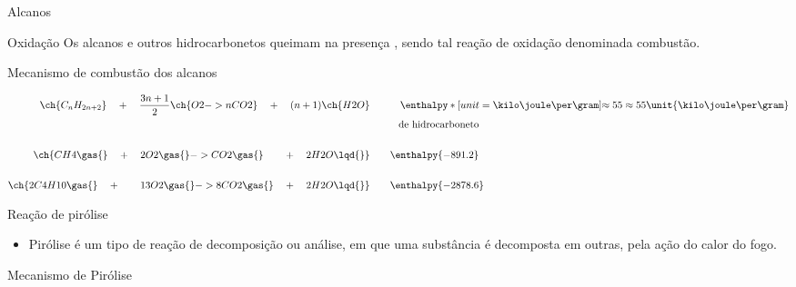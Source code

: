 \documentclass{beamer}
\begin{document}
\begin{frame}[label={sec:orga0e5a76}]{Alcanos}
\begin{block}{Oxidação}
Os \alert{alcanos} e outros \alert{hidrocarbonetos} queimam na presença , sendo tal reação de oxidação denominada
\alert{combustão}.


\begin{bclogo}[couleur=blue!30 , arrondi=0.1 , logo=\bcplume , epBarre=3.5]{Mecanismo de combustão dos alcanos}


\begin{align*}
\ch{C_nH_{2n+2}} \quad + \quad  \frac{3n+1}{2}\ch{O2 -> n CO2}\quad +\quad (n+1)\ch{H2O} & \qquad \quad \enthalpy*[unit=\kilo\joule\per\gram]{\approx 55} \approx 55 \unit{\kilo\joule\per\gram}\\ & \hspace{1cm} \mathrm{de~hidrocarboneto} \\ \\
\ch{CH4\gas{} \quad{} + \quad{} 2 O2\gas{} -> CO2\gas{} \qquad{} + \quad{} 2 H2O\lqd{}} & \quad \quad \enthalpy{-891.2}\\ \\
	\ch{2 C4H10\gas{} \quad{} + \qquad{} 13 O2\gas{} -> 8 CO2\gas{} \quad{} + \quad{} 2 H2O\lqd{}} & \quad \quad \enthalpy{-2878.6}    
\end{align*}
\end{bclogo}
\end{block}


\begin{block}{Reação de pirólise}
\begin{itemize}
\item \alert{Pirólise} é um tipo de reação de decomposição ou análise, em que uma substância é decomposta em outras, pela ação do calor do fogo.
\end{itemize}



\begin{bclogo}[couleur=blue!30 , arrondi=0.1 , logo=\bcplume , epBarre=3.5]{Mecanismo de Pirólise}




\end{bclogo}
\end{block}
\end{frame}
\end{document}
